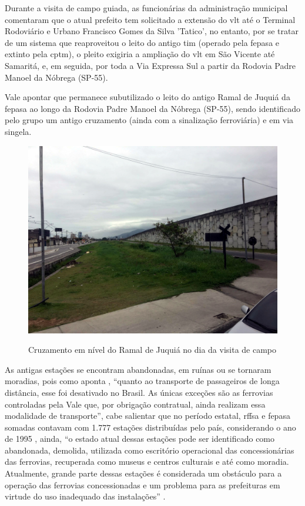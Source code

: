 	Durante a visita de campo guiada, as funcionárias da administração municipal comentaram que o atual prefeito tem solicitado a extensão do \gls{vlt} até o Terminal Rodoviário e Urbano Francisco Gomes da Silva 'Tatico', no entanto, por se tratar de um sistema que reaproveitou o leito do antigo \gls{tim} (operado pela \gls{fepasa} e extinto pela \gls{cptm}), o pleito exigiria a ampliação do \gls{vlt} em São Vicente até Samaritá, e, em seguida, por toda a Via Expressa Sul a partir da Rodovia Padre Manoel da Nóbrega (SP-55).
	
	Vale apontar que permanece subutilizado o leito do antigo Ramal de Juquiá da \gls{fepasa} ao longo da Rodovia Padre Manoel da Nóbrega (SP-55), sendo identificado pelo grupo um antigo cruzamento (ainda com a sinalização ferroviária) e em via singela.

	\begin{figure}[!htb]
		\centering
		\caption{Cruzamento em nível do Ramal de Juquiá no dia da visita de campo}
		\includegraphics[width=1\textwidth]{img/foto_juquia.jpg}
		\label{foto_juquia}
	\end{figure}
	
	As antigas estações se encontram abandonadas, em ruínas ou se tornaram moradias, pois como aponta , ``quanto ao transporte de passageiros de longa distância, esse foi desativado no Brasil. As únicas exceções são as ferrovias controladas pela Vale que, por obrigação contratual, ainda realizam essa modalidade de transporte'', cabe salientar que no período estatal, \gls{rffsa} e \gls{fepasa} somadas contavam com 1.777 estações distribuídas pelo país, considerando o ano de 1995 \cite[p.61]{Pires2011a}, ainda, ``o estado atual dessas estações pode ser identificado como abandonada, demolida, utilizada como escritório operacional das concessionárias das ferrovias, recuperada como museus e centros culturais e até como moradia. Atualmente, grande parte dessas estações é considerada um obstáculo para a operação das ferrovias concessionadas e um problema para as prefeituras em virtude do uso inadequado das instalações'' \cite[p.61-62]{Pires2011a}.
	
